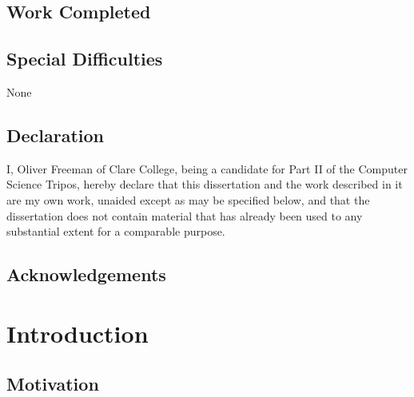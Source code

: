 \documentclass[12pt,notitlepage]{report}
\begin{document}

\section*{Work Completed}


\section*{Special Difficulties}

None
 
\newpage
\section*{Declaration}

I, Oliver Freeman of Clare College, being a candidate for Part II of the Computer
Science Tripos, hereby declare that this dissertation and the work described in it are my own work,
unaided except as may be specified below, and that the dissertation
does not contain material that has already been used to any substantial
extent for a comparable purpose.

\bigskip
{}

\medskip
{}

\cleardoublepage

\tableofcontents

\listoffigures

\newpage
\section*{Acknowledgements}



\cleardoublepage        %

\setcounter{page}{1}
\pagestyle{headings}

\chapter{Introduction}

\section{Motivation}
\end{document}
